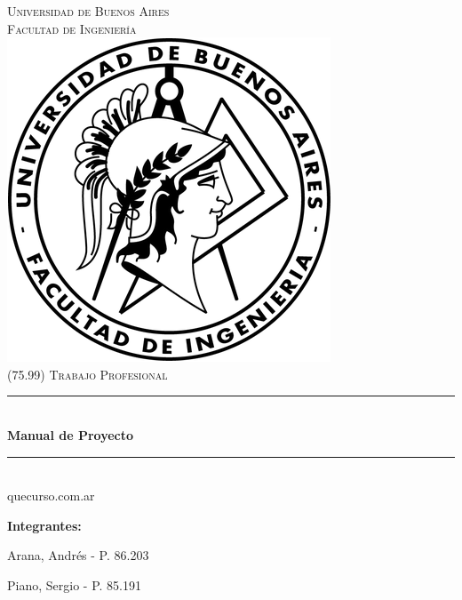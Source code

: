 \documentclass[a4paper,11pt]{article}
\begin{document}

\thispagestyle{empty}

\begin{titlepage}

  \newcommand{\HRule}{\rule{\linewidth}{0.5mm}}
  \newenvironment{bottompar}{\par\vspace*{\fill}}{\clearpage}

  \center

  \textsc{\LARGE Universidad de Buenos Aires}\\[0.5cm]
  \textsc{\Large Facultad de Ingeniería}\\[1.5cm]

  \includegraphics[scale=0.5]{src/common/logo.png}\\[1cm]


  \textsc{\large (75.99) Trabajo Profesional}\\[0.25cm]
  \HRule \\[0.4cm]
  {\huge \bfseries Manual de Proyecto}
  \HRule \\[0.4cm]

  {\large quecurso.com.ar}

  \begin{bottompar}
    \flushleft
    {\bfseries Integrantes:}

    Arana, Andrés          - P. 86.203

    Piano, Sergio          - P. 85.191
  \end{bottompar}

\end{titlepage}
\end{document}
